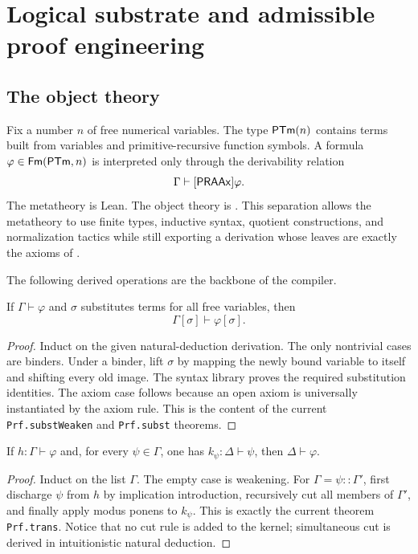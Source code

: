 \section{Logical substrate and admissible proof engineering}\label{sec:logic}

\subsection{The object theory}

Fix a number \(n\) of free numerical variables.  The type \(\mathsf{PTm}(n)\) contains terms built from variables and primitive-recursive function symbols.  A formula \(\varphi\in\mathsf{Fm}(\mathsf{PTm},n)\) is interpreted only through the derivability relation
\[
  \Gamma\vdash[\mathsf{PRAAx}]\varphi.
\]
The metatheory is Lean.  The object theory is \iPRA.  This separation allows the metatheory to use finite types, inductive syntax, quotient constructions, and normalization tactics while still exporting a derivation whose leaves are exactly the axioms of \iPRA.

The following derived operations are the backbone of the compiler.

\begin{lemma}[Substitution]
If \(\Gamma\vdash\varphi\) and \(\sigma\) substitutes terms for all free variables, then
\[
  \Gamma[\sigma]\vdash\varphi[\sigma].
\]
\end{lemma}

\begin{proof}
Induct on the given natural-deduction derivation.  The only nontrivial cases are binders.  Under a binder, lift \(\sigma\) by mapping the newly bound variable to itself and shifting every old image.  The syntax library proves the required substitution identities.  The axiom case follows because an open axiom is universally instantiated by the axiom rule.  This is the content of the current \texttt{Prf.substWeaken} and \texttt{Prf.subst} theorems.
\end{proof}

\begin{lemma}\label{lem:cut}
If \(h:\Gamma\vdash\varphi\) and, for every \(\psi\in\Gamma\), one has \(k_\psi:\Delta\vdash\psi\), then \(\Delta\vdash\varphi\).
\end{lemma}

\begin{proof}
Induct on the list \(\Gamma\).  The empty case is weakening.  For \(\Gamma=\psi::\Gamma'\), first discharge \(\psi\) from \(h\) by implication introduction, recursively cut all members of \(\Gamma'\), and finally apply modus ponens to \(k_\psi\).  This is exactly the current theorem \texttt{Prf.trans}.  Notice that no cut rule is added to the kernel; simultaneous cut is derived in intuitionistic natural deduction.
\end{proof}

